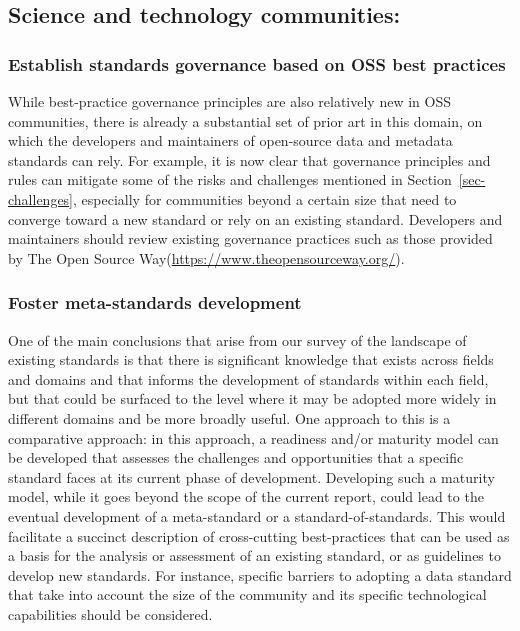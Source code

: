 \documentclass[
  number]{elsarticle}
\begin{document}
\subsection{Science and technology
communities:}\label{science-and-technology-communities}

\subsubsection{Establish standards governance based on OSS best
practices}\label{establish-standards-governance-based-on-oss-best-practices}

While best-practice governance principles are also relatively new in OSS
communities, there is already a substantial set of prior art in this
domain, on which the developers and maintainers of open-source data and
metadata standards can rely. For example, it is now clear that
governance principles and rules can mitigate some of the risks and
challenges mentioned in Section~\ref{sec-challenges}, especially for
communities beyond a certain size that need to converge toward a new
standard or rely on an existing standard. Developers and maintainers
should review existing governance practices such as those provided by
The Open Source
Way(\href{https://www.theopensourceway.org/the_open_source_way-guidebook-2.0.html\#_project_and_community_governance}{https://www.theopensourceway.org/}).

\subsubsection{Foster meta-standards
development}\label{foster-meta-standards-development}

One of the main conclusions that arise from our survey of the landscape
of existing standards is that there is significant knowledge that exists
across fields and domains and that informs the development of standards
within each field, but that could be surfaced to the level where it may
be adopted more widely in different domains and be more broadly useful.
One approach to this is a comparative approach: in this approach, a
readiness and/or maturity model can be developed that assesses the
challenges and opportunities that a specific standard faces at its
current phase of development. Developing such a maturity model, while it
goes beyond the scope of the current report, could lead to the eventual
development of a meta-standard or a standard-of-standards. This would
facilitate a succinct description of cross-cutting best-practices that
can be used as a basis for the analysis or assessment of an existing
standard, or as guidelines to develop new standards. For instance,
specific barriers to adopting a data standard that take into account the
size of the community and its specific technological capabilities should
be considered.
\end{document}
